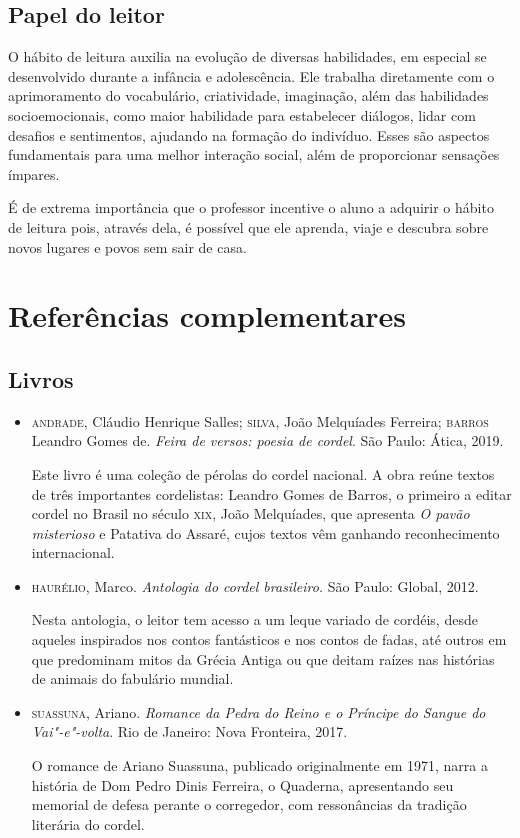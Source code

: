 \documentclass{article}
\begin{document}
\subsection{Papel do leitor}

O hábito de leitura auxilia na evolução de diversas habilidades, em
especial se desenvolvido durante a infância e adolescência. Ele trabalha
diretamente com o aprimoramento do vocabulário, criatividade,
imaginação, além das habilidades socioemocionais, como maior habilidade
para estabelecer diálogos, lidar com desafios e sentimentos, ajudando na
formação do indivíduo. Esses são aspectos fundamentais para uma melhor
interação social, além de proporcionar sensações ímpares.

É de extrema importância que o professor incentive o aluno a adquirir o
hábito de leitura pois, através dela, é possível que ele aprenda, viaje
e descubra sobre novos lugares e povos sem sair de casa.

\section{Referências complementares}

\subsection{Livros}

\begin{itemize}
\item\textsc{andrade}, Cláudio Henrique Salles; \textsc{silva}, João Melquíades Ferreira;   \textsc{barros} Leandro Gomes de. \textit{Feira de versos: poesia de cordel}.
  São Paulo: Ática, 2019.
  
Este livro é uma coleção de pérolas do cordel nacional. A obra reúne
textos de três importantes cordelistas: Leandro Gomes de Barros, o
primeiro a editar cordel no Brasil no século \textsc{xix}, João Melquíades, que
apresenta \emph{O pavão misterioso} e Patativa do Assaré, cujos textos
vêm ganhando reconhecimento internacional.

\item\textsc{haurélio}, Marco. \textit{Antologia do cordel brasileiro.} São Paulo:
  Global, 2012.

Nesta antologia, o leitor tem acesso a um leque variado de cordéis,
desde aqueles inspirados nos contos fantásticos e nos contos de fadas,
até outros em que predominam mitos da Grécia Antiga ou que deitam raízes
nas histórias de animais do fabulário mundial.

\item\textsc{suassuna}, Ariano. \textit{Romance da Pedra do Reino e o Príncipe do
  Sangue do Vai"-e"-volta}. Rio de Janeiro: Nova Fronteira, 2017.


O romance de Ariano Suassuna, publicado originalmente em 1971, narra a
história de Dom Pedro Dinis Ferreira, o Quaderna, apresentando seu
memorial de defesa perante o corregedor, com ressonâncias da tradição
literária do cordel.
\end{itemize}
\end{document}
